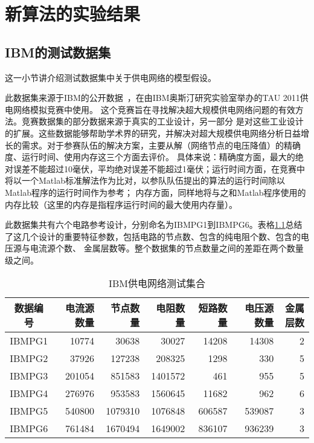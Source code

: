 \chapter{新算法的实验结果}
\label{cha:exp}

\section{IBM的测试数据集}

这一小节讲介绍测试数据集中关于供电网络的模型假设。

此数据集来源于IBM的公开数据~\cite{nassif2008power}，在由IBM奥斯汀研究实验室举办的TAU 2011供电网络模拟竞赛中使用。 这个竞赛旨在寻找解决超大规模供电网络问题的有效方法。竞赛数据集的部分数据来源于真实的工业设计，另一部分
是对这些工业设计的扩展。这些数据能够帮助学术界的研究，并解决对超大规模供电网络分析日益增长的需求。对于参赛队伍的解决方案，主要从解（网络节点的电压降值）的精确度、运行时间、使用内存这三个方面去评价。
具体来说：精确度方面，最大的绝对误差不能超过10毫伏，平均绝对误差不能超过1毫伏；运行时间方面，在竞赛中将以一个Matlab标准解法作为比对，以参队队伍提出的算法的运行时间除以Matlab程序的运行时间作为参考；
内存方面，同样地将与之和Matlab程序使用的内存比较（这里的内存是指程序运行时间的最大使用内存量）。


此数据集共有六个电路参考设计，分别命名为IBMPG1到IBMPG6。表格\ref{tab:tabibm}总结了这几个设计的重要特征参数，包括电路的节点数、包含的纯电阻个数、包含的电压源与电流源个数、
金属层数等。整个数据集的节点数量之间的差距在两个数量级之间。

\begin{table}[htbp]
\centering
\caption{IBM供电网络测试集合}
\label{tab:tabibm}
\begin{tabular}{|c|r|r|r|r|r|r|}
\toprule[1.5pt]
\hline
数据编号 & 电流源数量 & 节点数量 & 电阻数量 & 短路数量 & 电压源数量 & 金属层数 \\
\hline
IBMPG1 & 10774 & 30638  & 30027  & 14208  &  14308 & 2\\
\hline
IBMPG2 & 37926 & 127238 & 208325 & 1298  & 330 & 5\\
\hline
IBMPG3 & 201054 & 851583 & 1401572 & 461 & 955 &  5\\
\hline
IBMPG4 & 276976 & 953583 & 1560645 & 11682 & 962  & 6\\
\hline
IBMPG5 & 540800 & 1079310 & 1076848 & 606587 & 539087 &  3\\
\hline
IBMPG6 & 761484 & 1670494 & 1649002 & 836107 & 936239 &  3\\
\hline
\end{tabular}
\end{table}

